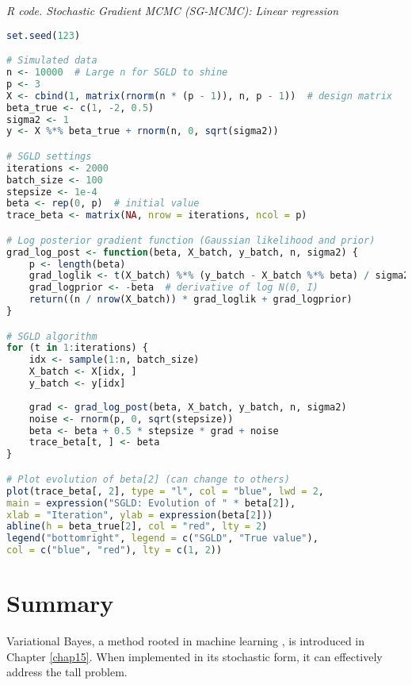 \begin{tcolorbox}[enhanced,width=4.67in,center upper,
	fontupper=\large\bfseries,drop shadow southwest,sharp corners]
	\textit{R code. Stochastic Gradient MCMC (SG-MCMC): Linear regression}
	\begin{VF}
		\begin{lstlisting}[language=R]
set.seed(123)

# Simulated data
n <- 10000  # Large n for SGLD to shine
p <- 3
X <- cbind(1, matrix(rnorm(n * (p - 1)), n, p - 1))  # design matrix
beta_true <- c(1, -2, 0.5)
sigma2 <- 1
y <- X %*% beta_true + rnorm(n, 0, sqrt(sigma2))

# SGLD settings
iterations <- 2000
batch_size <- 100
stepsize <- 1e-4
beta <- rep(0, p)  # initial value
trace_beta <- matrix(NA, nrow = iterations, ncol = p)

# Log posterior gradient function (Gaussian likelihood and prior)
grad_log_post <- function(beta, X_batch, y_batch, n, sigma2) {
	p <- length(beta)
	grad_loglik <- t(X_batch) %*% (y_batch - X_batch %*% beta) / sigma2
	grad_logprior <- -beta  # derivative of log N(0, I)
	return((n / nrow(X_batch)) * grad_loglik + grad_logprior)
}

# SGLD algorithm
for (t in 1:iterations) {
	idx <- sample(1:n, batch_size)
	X_batch <- X[idx, ]
	y_batch <- y[idx]
	
	grad <- grad_log_post(beta, X_batch, y_batch, n, sigma2)
	noise <- rnorm(p, 0, sqrt(stepsize))
	beta <- beta + 0.5 * stepsize * grad + noise
	trace_beta[t, ] <- beta
}

# Plot evolution of beta[2] (can change to others)
plot(trace_beta[, 2], type = "l", col = "blue", lwd = 2,
main = expression("SGLD: Evolution of " * beta[2]),
xlab = "Iteration", ylab = expression(beta[2]))
abline(h = beta_true[2], col = "red", lty = 2)
legend("bottomright", legend = c("SGLD", "True value"),
col = c("blue", "red"), lty = c(1, 2))
		\end{lstlisting}
	\end{VF}
\end{tcolorbox}

\section{Summary}\label{13_6}
Variational Bayes, a method rooted in machine learning \cite{wainwright2008graphical}, is introduced in Chapter \ref{chap15}. When implemented in its stochastic form, it can effectively address the tall problem.

